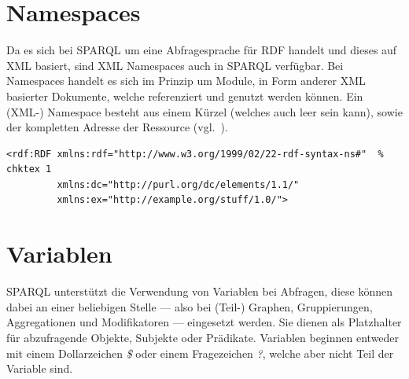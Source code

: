 \section{Namespaces}
\label{sec:sparql_namespaces}

Da es sich bei SPARQL um eine Abfragesprache für RDF handelt und dieses auf XML basiert, sind XML Namespaces auch in SPARQL verfügbar. Bei Namespaces handelt es sich im Prinzip um Module, in Form anderer XML basierter Dokumente, welche referenziert und genutzt werden können. Ein (XML-) Namespace besteht aus einem Kürzel (welches auch leer sein kann), sowie der kompletten Adresse der Ressource (vgl.~\cite[2.1 Introduction]{w3rdf_syntax}).

\begin{lstlisting}
<rdf:RDF xmlns:rdf="http://www.w3.org/1999/02/22-rdf-syntax-ns#"  % chktex 1
         xmlns:dc="http://purl.org/dc/elements/1.1/"
         xmlns:ex="http://example.org/stuff/1.0/">
\end{lstlisting}

\section{Variablen}
\label{sec:sparql_variablen}

SPARQL unterstützt die Verwendung von Variablen bei Abfragen, diese können dabei an einer beliebigen Stelle --- also bei (Teil-) Graphen, Gruppierungen, Aggregationen und Modifikatoren --- eingesetzt werden.
Sie dienen als Platzhalter für abzufragende Objekte, Subjekte oder Prädikate. Variablen beginnen entweder mit einem Dollarzeichen \textit{\$} oder einem Fragezeichen \textit{?}, welche aber nicht Teil der Variable sind.

